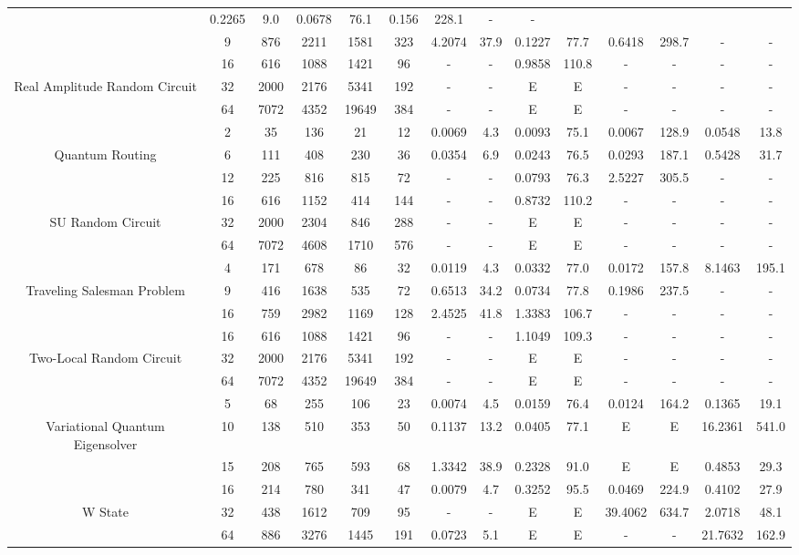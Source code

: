 \begin{table}[htb]
{\begin{tabular}{|c|c|c|c|c|c|c|c|c|c|c|c|c|c|}
 & 0.2265 & 9.0
 & 0.0678 & 76.1
 & 0.156 & 228.1
 & - & -
 \\
 & 
9 & 876 & 2211 & 1581 & 323
 & 4.2074 & 37.9
 & 0.1227 & 77.7
 & 0.6418 & 298.7
 & - & -
 \\
\hline
 & 
16 & 616 & 1088 & 1421 & 96
 & - & -
 & 0.9858 & 110.8
 & - & -
 & - & -
 \\
Real Amplitude Random Circuit & 
32 & 2000 & 2176 & 5341 & 192
 & - & -
 & E & E
 & - & -
 & - & -
 \\
 & 
64 & 7072 & 4352 & 19649 & 384
 & - & -
 & E & E
 & - & -
 & - & -
 \\
\hline
 & 
2 & 35 & 136 & 21 & 12
 & 0.0069 & 4.3
 & 0.0093 & 75.1
 & 0.0067 & 128.9
 & 0.0548 & 13.8
 \\
Quantum Routing & 
6 & 111 & 408 & 230 & 36
 & 0.0354 & 6.9
 & 0.0243 & 76.5
 & 0.0293 & 187.1
 & 0.5428 & 31.7
 \\
 & 
12 & 225 & 816 & 815 & 72
 & - & -
 & 0.0793 & 76.3
 & 2.5227 & 305.5
 & - & -
 \\
\hline
 & 
16 & 616 & 1152 & 414 & 144
 & - & -
 & 0.8732 & 110.2
 & - & -
 & - & -
 \\
SU Random Circuit & 
32 & 2000 & 2304 & 846 & 288
 & - & -
 & E & E
 & - & -
 & - & -
 \\
 & 
64 & 7072 & 4608 & 1710 & 576
 & - & -
 & E & E
 & - & -
 & - & -
 \\
\hline
 & 
4 & 171 & 678 & 86 & 32
 & 0.0119 & 4.3
 & 0.0332 & 77.0
 & 0.0172 & 157.8
 & 8.1463 & 195.1
 \\
Traveling Salesman Problem & 
9 & 416 & 1638 & 535 & 72
 & 0.6513 & 34.2
 & 0.0734 & 77.8
 & 0.1986 & 237.5
 & - & -
 \\
 & 
16 & 759 & 2982 & 1169 & 128
 & 2.4525 & 41.8
 & 1.3383 & 106.7
 & - & -
 & - & -
 \\
\hline
 & 
16 & 616 & 1088 & 1421 & 96
 & - & -
 & 1.1049 & 109.3
 & - & -
 & - & -
 \\
Two-Local Random Circuit & 
32 & 2000 & 2176 & 5341 & 192
 & - & -
 & E & E
 & - & -
 & - & -
 \\
 & 
64 & 7072 & 4352 & 19649 & 384
 & - & -
 & E & E
 & - & -
 & - & -
 \\
\hline
 & 
5 & 68 & 255 & 106 & 23
 & 0.0074 & 4.5
 & 0.0159 & 76.4
 & 0.0124 & 164.2
 & 0.1365 & 19.1
 \\
Variational Quantum Eigensolver & 
10 & 138 & 510 & 353 & 50
 & 0.1137 & 13.2
 & 0.0405 & 77.1
 & E & E
 & 16.2361 & 541.0
 \\
 & 
15 & 208 & 765 & 593 & 68
 & 1.3342 & 38.9
 & 0.2328 & 91.0
 & E & E
 & 0.4853 & 29.3
 \\
\hline
 & 
16 & 214 & 780 & 341 & 47
 & 0.0079 & 4.7
 & 0.3252 & 95.5
 & 0.0469 & 224.9
 & 0.4102 & 27.9
 \\
W State & 
32 & 438 & 1612 & 709 & 95
 & - & -
 & E & E
 & 39.4062 & 634.7
 & 2.0718 & 48.1
 \\
 & 
64 & 886 & 3276 & 1445 & 191
 & 0.0723 & 5.1
 & E & E
 & - & -
 & 21.7632 & 162.9
 \\
\hline
\end{tabular}}
\end{table}